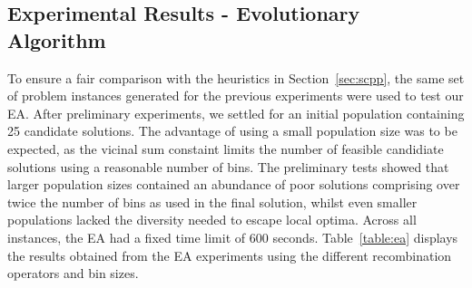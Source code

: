\documentclass[authoryear]{elsarticle}
\begin{document}
\subsection{Experimental Results - Evolutionary Algorithm}
\label{sub:expea}
\noindent To ensure a fair comparison with the heuristics in Section~\ref{sec:scpp}, the same set of problem instances generated for the previous experiments were used to test our EA. After preliminary experiments, we settled for an initial population containing 25 candidate solutions. The advantage of using a small population size was to be expected, as the vicinal sum constaint limits the number of feasible candidiate solutions using a reasonable number of bins. The preliminary tests showed that larger population sizes contained an abundance of poor solutions comprising over twice the number of bins as used in the final solution, whilst even smaller populations lacked the diversity needed to escape local optima. Across all instances, the EA had a fixed time limit of 600 seconds. Table~\ref{table:ea} displays the results obtained from the EA experiments using the different recombination operators and bin sizes.
\end{document}
